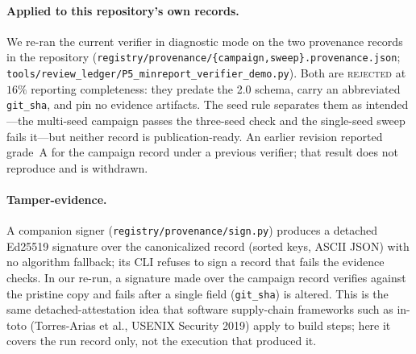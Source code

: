 \paragraph{Applied to this repository's own records.} We re-ran the current
verifier in diagnostic mode on the two provenance records in the repository
(\texttt{registry/provenance/\{campaign,sweep\}.provenance.json};
\texttt{tools/review\_ledger/P5\_minreport\_verifier\_demo.py}). Both are
\textsc{rejected} at $16\%$ reporting completeness: they predate the 2.0
schema, carry an abbreviated \texttt{git\_sha}, and pin no evidence
artifacts. The seed rule separates them as intended---the multi-seed campaign
passes the three-seed check and the single-seed sweep fails it---but neither
record is publication-ready. An earlier revision reported grade~A for the
campaign record under a previous verifier; that result does not reproduce and
is withdrawn.

\paragraph{Tamper-evidence.} A companion signer
(\texttt{registry/provenance/sign.py}) produces a detached Ed25519 signature
over the canonicalized record (sorted keys, ASCII JSON) with no algorithm
fallback; its CLI refuses to sign a record that fails the evidence checks. In
our re-run, a signature made over the campaign record verifies against the
pristine copy and fails after a single field (\texttt{git\_sha}) is altered.
This is the same detached-attestation idea that software supply-chain
frameworks such as in-toto (Torres-Arias et al., USENIX Security 2019) apply to
build steps; here it covers the run record only, not the execution that
produced it.
